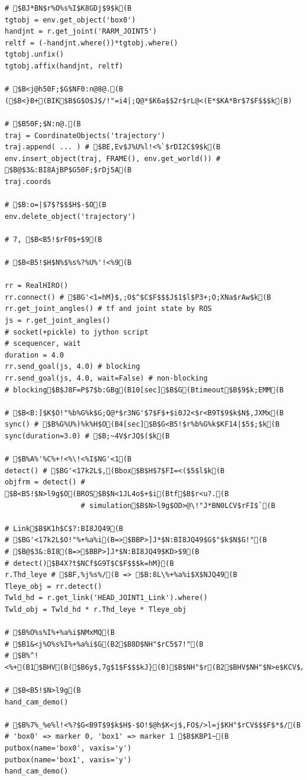 \documentclass[11pt]{jreport}
\begin{document}
{{{{{{{{{{{{{{\begin{verbatim}
# $BJ*BN$r%O%s%I$K8GDj$9$k(B
tgtobj = env.get_object('box0')
handjnt = r.get_joint('RARM_JOINT5')
reltf = (-handjnt.where())*tgtobj.where()
tgtobj.unfix()
tgtobj.affix(handjnt, reltf)

# $B<j@h50F;$G$NF0:n@8@.(B ($B<}B+(BIK$B$G$O$J$/!"=i4|;Q@*$K6a$$2r$rL@<(E*$KA*Br$7$F$$$k(B)

# $B50F;$N:n@.(B
traj = CoordinateObjects('trajectory')
traj.append( ... ) # $BE,Ev$J%U%l!<%`$rDI2C$9$k(B
env.insert_object(traj, FRAME(), env.get_world()) # $B@$3&:BI8AjBP$G50F;$rDj5A(B
traj.coords

# $B:o=|$7$?$$$H$-$O(B
env.delete_object('trajectory')

# 7, $B<B5!$rF0$+$9(B

# $B<B5!$H$N%$%s%?%U%'!<%9(B

rr = RealHIRO()
rr.connect() # $BG'<1=hM}$,;O$^$C$F$$$J$1$l$P3+;O;XNa$rAw$k(B
rr.get_joint_angles() # tf and joint state by ROS
js = r.get_joint_angles()
# socket(+pickle) to jython script
# scequencer, wait
duration = 4.0
rr.send_goal(js, 4.0) # blocking
rr.send_goal(js, 4.0, wait=False) # non-blocking
# blocking$B$J8F=P$7$b:GBg(B10[sec]$B$G(Btimeout$B$9$k;EMM(B

# $B<B:]$K$O!"%b%G%k$G;Q@*$r3NG'$7$F$+$i0J2<$r<B9T$9$k$N$,JXMx(B
sync() # $B%G%U%)%k%H$O(B4[sec]$B$G<B5!$r%b%G%k$KF14|$5$;$k(B
sync(duration=3.0) # $B;~4V$rJQ$($k(B

# $B%A%'%C%+!<%\!<%I$NG'<1(B
detect() # $BG'<17k2L$,(Bbox$B$H$7$FI=<($5$l$k(B
objfrm = detect() # $B<B5!$N>l9g$O(BROS$B$N<1JL4o$+$i(Btf$B$r<u?.(B
                  # simulation$B$N>l9g$OD>@\!"J*BN0LCV$rFI$`(B

# Link$B$K1h$C$?:BI8JQ49(B
# $BG'<17k2L$O!"%+%a%i(B=>$BBP>]J*$N:BI8JQ49$G$"$k$N$G!"(B
# $B@$3&:BI8(B=>$BBP>]J*$N:BI8JQ49$KD>$9(B
# detect()$B4X?t$NCf$G9T$C$F$$$k=hM}(B
r.Thd_leye # $BF,%j%s%/(B => $B:8L\%+%a%i$X$NJQ49(B
Tleye_obj = rr.detect()
Twld_hd = r.get_link('HEAD_JOINT1_Link').where()
Twld_obj = Twld_hd * r.Thd_leye * Tleye_obj

# $B%O%s%I%+%a%i$NMxMQ(B
# $B1&<j%O%s%I%+%a%i$G(B2$B8D$NH"$rC5$7!"(B
# $B%^!<%+(B1$BHV(B($B6y$,7g$1$F$$$kJ}(B)$B$NH"$r(B2$BHV$NH"$N>e$KCV$/(B

# $B<B5!$N>l9g(B
hand_cam_demo()

# $B%7%_%e%l!<%?$G<B9T$9$k$H$-$O!$@h$K<j$,FO$/>l=j$KH"$rCV$$$F$*$/(B
# 'box0' => marker 0, 'box1' => marker 1 $B$KBP1~(B
putbox(name='box0', vaxis='y')
putbox(name='box1', vaxis='y')
hand_cam_demo()


\end{verbatim}}}}}}}}}}}}}}}
\end{document}
